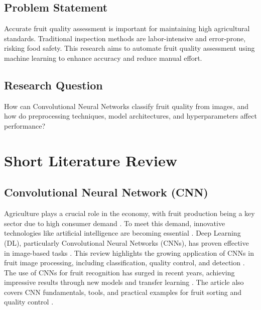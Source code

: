 \documentclass[a4paper,oneside,11pt]{book}
\begin{document}
\section{Problem Statement}
Accurate fruit quality assessment is important for maintaining high agricultural standards. Traditional inspection methods are labor-intensive and error-prone, risking food safety. This research aims to automate fruit quality assessment using machine learning to enhance accuracy and reduce manual effort.
\section{Research Question}
How can Convolutional Neural Networks classify fruit quality from images, and how do preprocessing techniques, model architectures, and hyperparameters affect performance?
\pagestyle{plain}
\chapter{Short Literature Review}
\section{Convolutional Neural Network (CNN)}
Agriculture plays a crucial role in the economy, with fruit production being a key sector due to high consumer demand \citep{naranjo2020review}. To meet this demand, innovative technologies like artificial intelligence are becoming essential \citep{naranjo2020review}. Deep Learning (DL), particularly Convolutional Neural Networks (CNNs), has proven effective in image-based tasks \citep{naranjo2020review}. This review highlights the growing application of CNNs in fruit image processing, including classification, quality control, and detection \citep{naranjo2020review}. The use of CNNs for fruit recognition has surged in recent years, achieving impressive results through new models and transfer learning \citep{naranjo2020review}. The article also covers CNN fundamentals, tools, and practical examples for fruit sorting and quality control \citep{naranjo2020review}.
\end{document}
